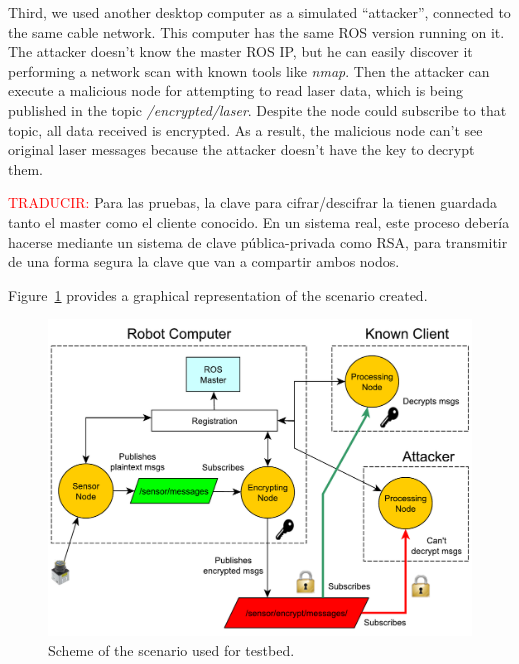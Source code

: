 \documentclass[journal,twoside]{JoPhA}
\begin{document}
Third, we used another desktop computer as a simulated ``attacker'', connected to the same  cable network. This computer has the same ROS version running on it. The attacker doesn't know the master ROS IP, but he can easily discover it performing a network scan with known tools like \textit{nmap}. Then the attacker can execute a malicious node for attempting to read laser data, which is being published in the topic \textit{/encrypted/laser}. Despite the node could subscribe to that topic, all data received is encrypted. As a result, the malicious node can't see original laser messages because the attacker doesn't have the key to decrypt them. 


\textcolor{red}{TRADUCIR:} Para las pruebas, la clave para cifrar/descifrar la tienen guardada tanto el master como el cliente conocido. En un sistema real, este proceso debería hacerse mediante un sistema de clave pública-privada como RSA, para transmitir de una forma segura la clave que van a compartir ambos nodos.

Figure~\ref{fig:TestBed} provides a graphical representation of the scenario created.


\begin{figure}[ht]
    \centering
    \includegraphics[width=.5\textwidth]{TestBed_complete.pdf}
    \caption{Scheme of the scenario used for testbed.}
  \label{fig:TestBed}
\end{figure}
\end{document}
